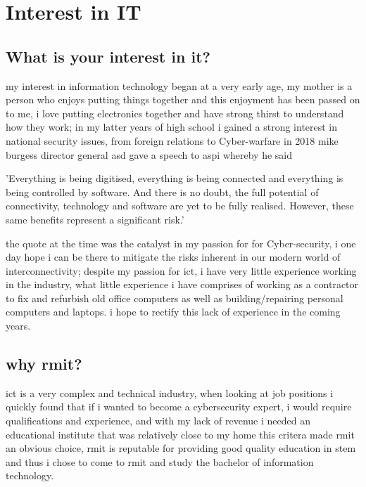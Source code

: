 \documentclass{article}
\begin{document}
\section{Interest in IT}


\subsection{What is your interest in it? }

my interest in information technology began at a very early age, my mother is a person who enjoys putting things together and this enjoyment has been passed on to me, i love putting electronics together and have strong thirst to understand how they work; in my latter years of high school i gained a strong interest in national security issues, from foreign relations to Cyber-warfare in 2018 mike burgess director general asd gave a speech to aspi whereby he said


 'Everything is being digitised, everything is being connected and everything is being controlled by software. And there is no doubt, the full potential of connectivity, technology and software are yet to be fully realised. However, these same benefits represent a significant risk.'


the quote at the time was the catalyst in my passion for for Cyber-security, i one day hope i can be there to mitigate the risks inherent in our modern world of interconnectivity; despite my passion for ict, i have very little experience working in the industry, what little experience i have comprises of working as a contractor to fix and refurbish old office computers as well as building/repairing personal computers and laptops. i hope to rectify this lack of experience in the coming years.
\newline

\subsection{why rmit?}

ict is a very complex and technical industry, when looking at job positions i quickly found that if i wanted to become a cybersecurity expert, i would require qualifications and experience, and with my lack of revenue i needed an educational institute that was relatively close to my home this critera made rmit an obvious choice, rmit is reputable for providing good quality education in stem and thus i chose to come to rmit and study the bachelor of information technology.\newline
\end{document}
